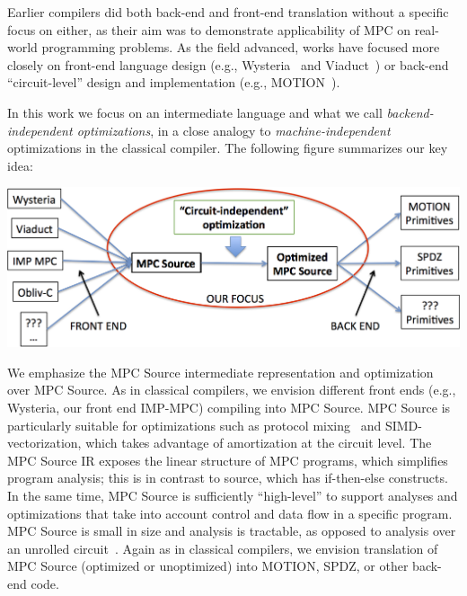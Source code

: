 Earlier compilers did both back-end and front-end translation without a specific focus on either, as their aim was to demonstrate applicability of MPC on real-world
programming problems. As the field advanced, works have focused more closely on front-end language design (e.g., Wysteria~\cite{SP:RasHamHic14} and Viaduct~\cite{Acay:2021})
or back-end ``circuit-level'' design and implementation (e.g., MOTION~\cite{Braun:2022}).

In this work we focus on an intermediate language and what we call \emph{backend-independent optimizations}, in a close analogy to \emph{machine-independent} optimizations
in the classical compiler. The following figure summarizes our key idea:

{\begin{center}
\includegraphics[width=0.8\linewidth]{figs_paper_SIMD/focus.png}
\end{center}
}

We emphasize the MPC Source intermediate representation and optimization over MPC Source. As in classical compilers, we envision different front ends (e.g., Wysteria,
our front end IMP-MPC) compiling into MPC Source. MPC Source is particularly suitable for optimizations such as protocol mixing~\cite{Ishaq:2019, Fang:2022} and SIMD-vectorization,
which takes advantage of amortization at the circuit level. The MPC Source IR exposes the linear structure of MPC programs, which simplifies program analysis; this is
in contrast to source, which has if-then-else constructs. In the same time, MPC Source is sufficiently ``high-level''  to support analyses and optimizations that take into account
control and data flow in a specific program. MPC Source is small in size and analysis is tractable, as opposed to analysis over an unrolled circuit~\cite{Ishaq:2019}. Again as
in classical compilers, we envision translation of MPC Source (optimized or unoptimized) into MOTION, SPDZ, or other back-end code.




